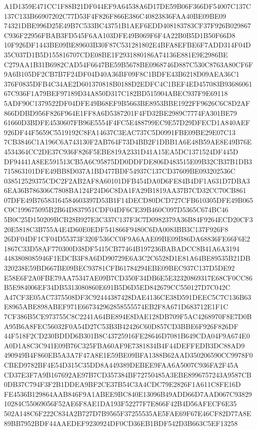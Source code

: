 \documentclass[UTF8,fontset=fandol,zihao=-4,a4paper]{ctexart}
\begin{document}
{{A1D1359E471CC1F88B21DF044EF9A64538A6D17DE59B06F366DF54007C137C137C133B66907202C77D53F4F826F866E386C40823836FAA40BE09BE09
74321DBE996D25E49B7C533BC43751B1AEF6EDD408183783CF37F926B029867C936F22956FBAB3FD545F6AA103DFE49B069F6F4A22B0B5D1B50F66D8
10F926DF1443BE09BE89603B30F87C531281802E4BFA8EFBE6F7ADD314F04D35C037D1B5D155816707CDE08BE1F2931880186A74136E881E9E2986BE
C279AA1B31B6982CAD54F6647BE59B5678BE0968746D887C530C8763A80CF6F9A6B105DF2CB7B7F24DF04D40A36BF09F8C1BDFE43B6218D09AEA36C1
376F0835DFB4C34AE2D601370818B0188D2EDFC4C1BEF4ED457083B9368606167C936F1A79BEF97189D34A850D317C182BD515904ABEC937F9E69118
5ADF90C1379522DF04DFE49B68EF9B5663BE8953BBE1922FF9626C6C8D2AF866DDBD956F826F964E1FF8A6D5387201F4FD32BE2989C7774FA301BE79
61660D3BDFE4530607FB96E5554F4FC5E488799EC9E57D29DFECD1A840AEF926DF44F5659C5519192C8FA14637C3EAC737C5D0991FBE09BE29E07C13
7CB3846C1A196C6A743130F2AB764F73D4BB2F1DBB1A6E48B59AE8E49B76E4534364CC2DE37C936F826F5EBE819A2331D41A15EA5DC1371524DF445D
DF94441A8EE591513CB5A6C95875DD0DDFDE806D483515E09B32CB37B1DB3715863101DFE49BB8D037A1BD477BDF54937C137CD37609BE093202536C
038512529375CDC2F2AB2AF8A60101DFB454DA0D6FE84B4DF1A631D7DBA36EA36B786306C7808BA124F24D6C8DA1FA29B1819AA37B7CD32CC70CB861
07DFE49B76583164584603397D53B1F14DECD80DCD727CFB610305DFE49B065C0C199675095B2B64D837951CDF04DF6CE39B460C097D5365C674BC46
5B0C25D150209BCB28B927E3C337C137F3C7D0982379A36B84F9264ECD20CF320E5818C3B755A4E4D60E0EDF541866F9480C6DA0083BB3C137F926F8
26DF04DF1CF04D55373F320F536CC0F9A6AAE09BE09B86DA68836FE66F6E21867C33D58AF770300D38DF5415CB77464B197236BABADCC8B41A6A3194
4483808085946F1EDCB3F8A6DD90729E6A3C2C6528D1E81A64BE89535B21DB320238E59BD667BE09BEC93781CFB61784294EBE09BEC937C137D5DE92
E58E6F2A0FBE79AA75347AE09B7CD350F34DB6E5E32320869317E68CF0CC86B5E984006EF34DB5313080860E691B5D6D5ED842679CC550127D7C042C
A47CF3E05AC7375508DF3C92444387428DAE4136CE38D591DEEC5C7C136B63E8965ABE898ABEF971E667342962858555574EB2F8A671D683712E1F1C
7CF386B5CE973755C8C2241A64BE894E8DAE128DB709F5AC4268970F8E7D0BA95B6A8FEC56032F0A54D27C53B3B42426C60D857CD3BBE6F926F826DF
44F518F2CD230BDDD6B301B8C43725916FE28646D7081B649CDA04F9A674E0A0D1A8C3C941E09B76C325FBA60AF9E7381834B4F44DEFFEDB3DC88AD9
490949B4F860EB5A3A7F47A8E1E59BE09BFA1388B62AAD350206590CC9978F0CBED9782BF4E54D315C35DD8A449389DEBEE9FAA6A5007C936FA2F45A
CD37E3F7A9B167692AE97B7CD357384BF72750485A3EBE8996757243A9587CB0DB37C794F3F2B1DDEA9BF2CE37B54C3A4CDC79E2826F1A611C8FE16D
FE4536B129864AAB846F9A1ABEE9BC840E13096B49ADD66D7AAD067C9382910284C55069056F52AE6F8AE1DA193F52277F7E866F42B4D56AFECF6E35
502A148C6F222C834A2B727D7B9565F37255535AE5FAE69F67E46CF82D77A8E89BB7952BDF44AAEDEF9230924DF0CD36EB1BDF542D3B663C5EF13258
}}
\end{document}
